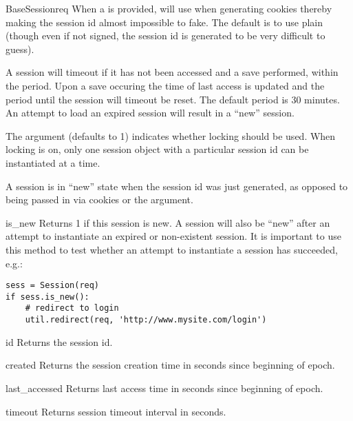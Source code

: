 \begin{classdesc}{BaseSession}{req}
  When a  is provided,  will use
   when generating cookies thereby making the
  session id almost impossible to fake. The default is to use plain
   (though even if not signed, the session id is
  generated to be very difficult to guess).

  A session will timeout if it has not been accessed and a save performed,
  within the  period. Upon a save occuring the time of last
  access is updated and the period until the session will timeout be reset.
  The default  period is 30 minutes. An attempt to load an
  expired session will result in a ``new'' session.

  The  argument (defaults to 1) indicates whether locking
  should be used. When locking is on, only one session object with a
  particular session id can be instantiated at a time.

  A session is in ``new'' state when the session id was just
  generated, as opposed to being passed in via cookies or the
   argument.


  \begin{methoddesc}[BaseSession]{is_new}{}
    Returns 1 if this session is new. A session will also be ``new''
    after an attempt to instantiate an expired or non-existent
    session. It is important to use this method to test whether an
    attempt to instantiate a session has succeeded, e.g.:
    \begin{verbatim}
sess = Session(req)
if sess.is_new():
    # redirect to login
    util.redirect(req, 'http://www.mysite.com/login')
    \end{verbatim}
  \end{methoddesc}

  \begin{methoddesc}[BaseSession]{id}{}
    Returns the session id.
  \end{methoddesc}

  \begin{methoddesc}[BaseSession]{created}{}
    Returns the session creation time in seconds since beginning of
    epoch.
  \end{methoddesc}

  \begin{methoddesc}[BaseSession]{last_accessed}{}
    Returns last access time in seconds since beginning of epoch.
  \end{methoddesc}

  \begin{methoddesc}[BaseSession]{timeout}{}
    Returns session timeout interval in seconds.
  \end{methoddesc}


\end{classdesc}
